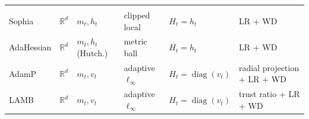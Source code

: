 \begin{table}[htbp]
\begin{tabularx}{\textwidth}{
  @{}
  p{}
  p{}
  Y 
  Y 
  Y 
  Y
  @{}}
    \midrule
     \\
    Sophia
      & $\mathbb{R}^d$ & $m_t,h_t$
      & clipped local & $H_t=h_t$ & LR + WD \\
    AdaHessian
      & $\mathbb{R}^d$ & $m_t,h_t$ (Hutch.)
      & metric ball & $H_t=h_t$ & LR + WD \\
    AdamP
      & $\mathbb{R}^d$ & $m_t,v_t$
      & adaptive $\ell_\infty$ & $H_t=\operatorname{diag}(v_t)$
      & radial projection + LR + WD \\
    LAMB
      & $\mathbb{R}^d$ & $m_t,v_t$
      & adaptive $\ell_\infty$ & $H_t=\operatorname{diag}(v_t)$
      & trust ratio + LR + WD \\
    \bottomrule
  \end{tabularx}
\end{table}
